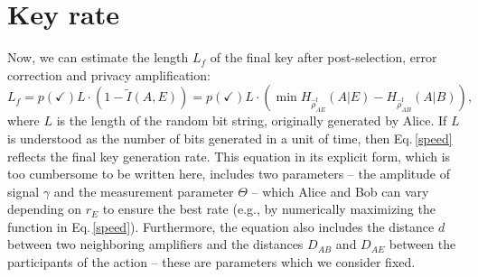 \documentclass[a4paper]{article}
\begin{document}
\begin{figure}[t]
    \noindent{}
\end{figure}
\section{Key rate}
Now, we can estimate the length $L_f$ of the final key after post-selection, error correction and privacy amplification:
\begin{equation}
\label{speed}
    L_f= p(\checkmark)L\cdot\left(1 - \tilde I(A,E)\right)=p(\checkmark)L\cdot\left(\min H_{\hat{\rho}^\text{f}_{AE}}(A | E)- H_{\hat{\rho}^\text{f}_{AB}}(A | B)\right),
\end{equation}
where $L$ is the length of the random bit string, originally generated by Alice.
If $L$ is understood as the number of bits generated in a unit of time, then Eq.\,\eqref{speed} reflects the final key generation rate.
This equation in its explicit form, which is too cumbersome to be written here, includes two parameters -- the amplitude of signal $\gamma$ and the measurement parameter $\Theta$ -- which Alice and Bob can vary depending on $r_E$ to ensure the best rate (e.g., by numerically maximizing the function in Eq.\,\eqref{speed}).
Furthermore, the equation also includes the distance $d$ between two neighboring amplifiers and the distances $D_{AB}$ and $D_{AE}$ between the participants of the action -- these are parameters which we consider fixed.

\begin{figure}[t]
    \noindent{}
\end{figure}
\end{document}
